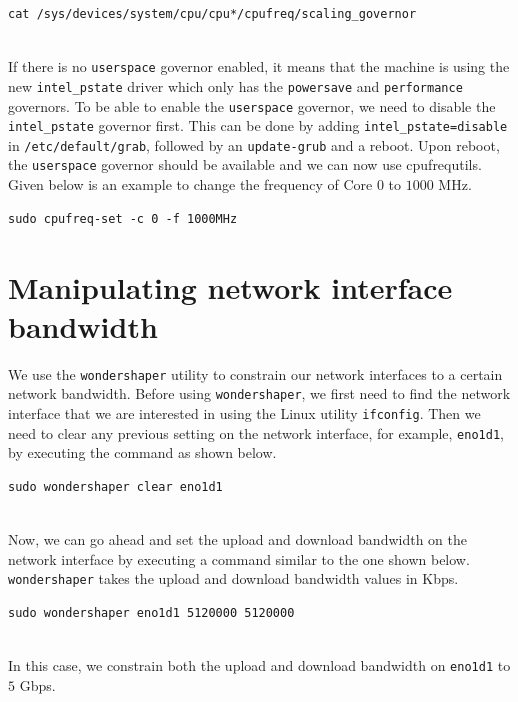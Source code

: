 \documentclass[11pt]{article}
\newcommand{\code}[1]{\colorbox{light-gray}{\texttt{#1}}}
\begin{document}
\begin{verbatim}
cat /sys/devices/system/cpu/cpu*/cpufreq/scaling_governor
\end{verbatim}
\\
If there is no \code{userspace} governor enabled, it means that the machine is using the new \code{intel\_pstate} driver which only has the \code{powersave} and \code{performance} governors. To be able to enable the \code{userspace} governor, we need to disable the \code{intel\_pstate} governor first. This can be done by adding \code{intel\_pstate=disable} in \code{/etc/default/grab}, followed by an \code{update-grub} and a reboot. Upon reboot, the \code{userspace} governor should be available and we can now use cpufrequtils. Given below is an example to change the frequency of Core $0$ to $1000$ MHz.
\begin{verbatim}
sudo cpufreq-set -c 0 -f 1000MHz
\end{verbatim}

\section{Manipulating network interface bandwidth}
\label{sec:app-net}

We use the \code{wondershaper} utility to constrain our network interfaces to a certain network bandwidth. Before using \code{wondershaper}, we first need to find the network interface that we are interested in using the Linux utility \code{ifconfig}. Then we need to clear any previous setting on the network interface, for example, \code{eno1d1}, by executing the command as shown below.
\begin{verbatim}
sudo wondershaper clear eno1d1
\end{verbatim}
\\
Now, we can go ahead and set the upload and download bandwidth on the network interface by executing a command similar to the one shown below. \code{wondershaper} takes the upload and download bandwidth values in Kbps.
\begin{verbatim}
sudo wondershaper eno1d1 5120000 5120000
\end{verbatim}
\\
In this case, we constrain both the upload and download bandwidth on \code{eno1d1} to $5$ Gbps.
\end{document}
